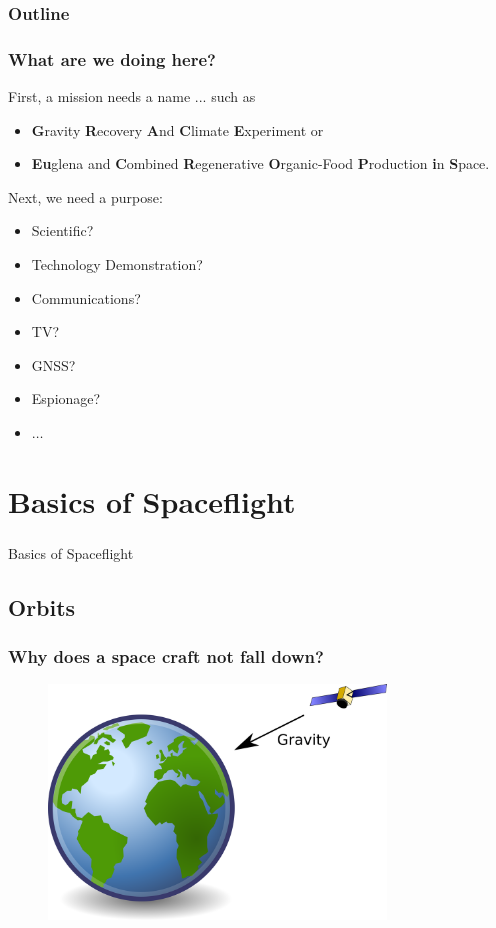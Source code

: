 \documentclass[12pt,utf8,notheorems,compress]{beamer}
\begin{document}
\begin{frame}
  \frametitle{Outline}
  \tableofcontents
\end{frame}

\begin{frame}
  \frametitle{What are we doing here?}
  \pause
  First, a mission needs a name ... such as
  \pause
  \begin{itemize}
    \item \textbf{G}ravity \textbf{R}ecovery \textbf{A}nd \textbf{C}limate \textbf{E}xperiment \pause or
    \item \textbf{Eu}glena and \textbf{C}ombined \textbf{R}egenerative \textbf{O}rganic-Food \textbf{P}roduction \textbf{i}n \textbf{S}pace.
  \end{itemize}
  \pause
  Next, we need a purpose:
  \pause
  \begin{itemize}
    \item Scientific? \pause
    \item Technology Demonstration? \pause
    \item Communications? \pause
    \item TV? \pause
    \item GNSS? \pause
    \item Espionage? \pause
    \item $\ldots$
  \end{itemize}
\end{frame}

\section{Basics of Spaceflight}

\begin{frame}
  \frametitle{}
  \vfill
  \begin{center}
    \Large Basics of Spaceflight
  \end{center}
  \vfill
\end{frame}

\subsection{Orbits}

\begin{frame}
  \frametitle{Why does a space craft not fall down?}
  \pause
  \begin{figure}[b]
    \centering
    \includegraphics[width=0.8\textwidth]{gravity1.png}
  \end{figure}
\end{frame}
\end{document}
